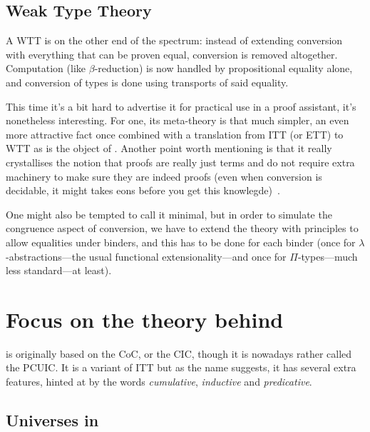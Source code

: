 \subsection{Weak Type Theory}

A \acrfull{WTT} is on the other end of the spectrum: instead of extending
conversion with everything that can be proven equal, conversion is removed
altogether. Computation (like \(\beta\)-reduction) is now handled by
propositional equality alone, and conversion of types is done using transports
of said equality.

This time it's a bit hard to advertise it for practical use in a proof
assistant, it's nonetheless interesting. For one, its meta-theory is that much
simpler, an even more attractive fact once combined with a translation from
\acrshort{ITT} (or \acrshort{ETT}) to \acrshort{WTT} as is the object of
.
Another point worth mentioning is that it really crystallises the notion that
proofs are really just terms and do not require extra machinery to make sure
they are indeed proofs (even when conversion is decidable, it might takes
eons before you get this knowlegde)~\misref.

One might also be tempted to call it minimal, but in order to simulate the
congruence aspect of conversion, we have to extend the theory with principles
to allow equalities under binders, and this has to be done for each binder
(once for \(\lambda\)-abstractions---the usual functional extensionality---and
once for \(\Pi\)-types---much less standard---at least).

\section{Focus on the theory behind \Coq}

\Coq is originally based on the \acrfull{CoC}, or the \acrfull{CIC}, though it
is nowadays rather called the \acrfull{PCUIC}.
It is a variant of \acrshort{ITT} but as the name suggests, it has several
extra features, hinted at by the words \emph{cumulative}, \emph{inductive}
and \emph{predicative}.

\subsection{Universes in \Coq}

